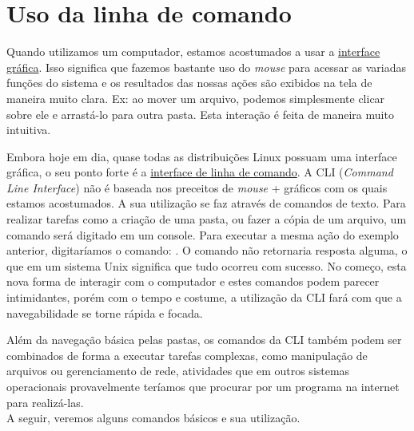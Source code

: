 \documentclass{handout_utfpr}
\newcommand{\com}[1]{
\colorbox{light-gray}{\texttt{\pbox{\textwidth}{\$ #1}}}
}
\newcommand{\cominline}[1]{
\colorbox{light-gray}{\texttt{\pbox{\textwidth}{#1}}}
}
\begin{document}
\section{Uso da linha de comando}

Quando utilizamos um computador, estamos acostumados a usar a \underline{interface gráfica}. Isso significa que fazemos bastante uso do \textit{mouse} para acessar as variadas funções do sistema e os resultados das nossas ações são exibidos na tela de maneira muito clara. Ex: ao mover um arquivo, podemos simplesmente clicar sobre ele e arrastá-lo para outra pasta. Esta interação é feita de maneira muito intuitiva.

Embora hoje em dia, quase todas as distribuições Linux possuam uma interface gráfica, o seu ponto forte é a \underline{interface de linha de comando}. A CLI (\textit{Command Line Interface}) não é baseada nos preceitos de \textit{mouse} + gráficos com os quais estamos acostumados. A sua utilização se faz através de comandos de texto. Para realizar tarefas como a criação de uma pasta, ou fazer a cópia de um arquivo, um comando será digitado em um console. Para executar a mesma ação do exemplo anterior, digitaríamos o comando: \com{mv local\_arquivo local\_destino}. O comando não retornaria resposta alguma, o que em um sistema Unix significa que tudo ocorreu com sucesso. No começo, esta nova forma de interagir com o computador e estes comandos podem parecer intimidantes, porém com o tempo e costume, a utilização da CLI fará com que a navegabilidade se torne rápida e focada.

Além da navegação básica pelas pastas, os comandos da CLI também podem ser combinados de forma a executar tarefas complexas, como manipulação de arquivos ou gerenciamento de rede, atividades que em outros sistemas operacionais provavelmente teríamos que procurar por um programa na internet para realizá-las.\\

A seguir, veremos alguns comandos básicos e sua utilização.

\end{document}
